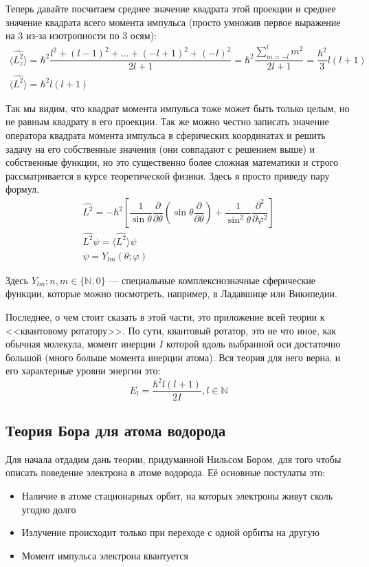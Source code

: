 \documentclass[12pt]{article}
\begin{document}
Теперь давайте посчитаем среднее значение квадрата этой проекции и среднее значение квадрата всего момента импульса (просто умножив первое выражение на 3 из-за изотропности по 3 осям):
\begin{gather*}
    \langle \hat{L_z^2}\rangle=\hbar^2\dfrac{l^2+ (l-1)^2 +\dots +(-l+1)^2 +(-l)^2}{2l+1} =\hbar^2\dfrac{\sum\limits_{m=-l}^{l}m^2}{2l+1} = \dfrac{\hbar^2}{3}l(l+1)\\
    \langle \hat{L^2}\rangle = \hbar^2l(l+1)
\end{gather*}

Так мы видим, что квадрат момента импульса тоже может быть только целым, но не равным квадрату в его проекции. Так же можно честно записать значение оператора квадрата момента импульса в сферических координатах и решить задачу на его собственные значения (они совпадают с решением выше) и собственные функции, но это существенно более сложная математики и строго рассматривается в курсе теоретической физики. Здесь я просто приведу пару формул. 
\begin{gather*}
     \hat{L^2} = -\hbar^2 \left[ \dfrac{1}{\sin{\theta}}\dfrac{\partial}{\partial\theta} \left(\sin{\theta}\dfrac{\partial}{\partial \theta}\right) + \dfrac{1}{\sin^2{\theta}}\dfrac{\partial^2}{\partial \varphi^2}\right]\\
     \hat{L^2} \psi = \langle \hat{L^2}\rangle \psi\\
     \psi = Y_{lm}(\theta; \varphi)
\end{gather*}

Здесь $Y_{lm}; n,m \in \{\mathbb{N}, 0\}$ --- специальные комплекснозначные сферические функции, которые можно посмотреть, например, в Ладавшице или Википедии.

Последнее, о чем стоит сказать в этой части, это приложение всей теории к <<квантовому ротатору>>. По сути, квантовый ротатор, это не что иное, как обычная молекула, момент инерции $I$ которой вдоль выбранной оси достаточно большой (много больше момента инерции атома). Вся теория для него верна, и его характерные уровни энергии это:
\begin{equation}
    E_l=\dfrac{\hbar^2l(l+1)}{2I}, l\in \mathbb{N}
\end{equation}

\subsection{Теория Бора для атома водорода}
Для начала отдадим дань теории, придуманной Нильсом Бором, для того чтобы описать поведение электрона в атоме водорода. Её основные постулаты это:
\begin{itemize}
    \item Наличие в атоме стационарных орбит, на которых электроны живут сколь угодно долго
    \item Излучение происходит только при переходе с одной орбиты на другую
    \item Момент импульса электрона квантуется
\end{itemize}
\end{document}
